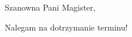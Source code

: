\documentclass[nopagenr]{UWletterhead}
\begin{document}

\newpage
\UWheader

Szanowna Pani Magister,





\textcolor{UWdBlue}{Nalegam na dotrzymanie terminu!}


\end{document}
